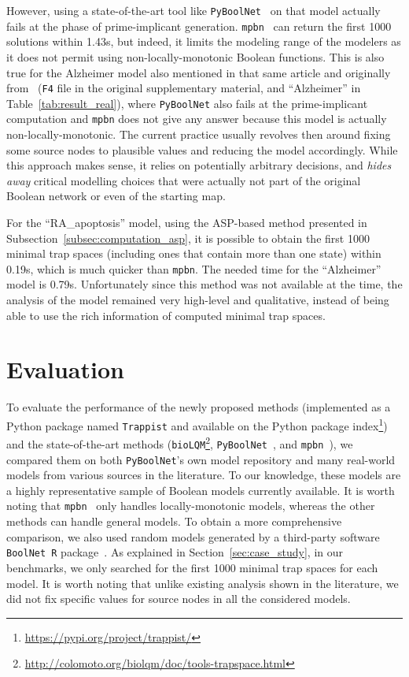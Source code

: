 \documentclass[preprint,12pt]{elsarticle}
\begin{document}
However, using a state-of-the-art tool like \texttt{PyBoolNet}~\cite{klarner2015computing} on that model actually fails at the phase of prime-implicant generation.
\texttt{mpbn}~\cite{Paulev2020} can return the first 1000 solutions within 1.43s, but indeed, it limits the modeling range of the modelers as it does not permit using non-locally-monotonic Boolean functions.
This is also true for the Alzheimer model also mentioned in that same article and originally from~\cite{ogishima2016alzpathway} (\verb|F4| file in the original supplementary material, and ``Alzheimer'' in Table~\ref{tab:result_real}), where \texttt{PyBoolNet} also fails at the prime-implicant computation and \texttt{mpbn} does not give any answer because this model is actually non-locally-monotonic.
The current practice usually revolves then around fixing some source nodes to plausible values and reducing the model accordingly.
While this approach makes sense, it relies on potentially arbitrary decisions, and \emph{hides away} critical modelling choices that were actually not part of the original Boolean network or even of the starting map.

For the ``RA\_apoptosis'' model, using the ASP-based method presented in Subsection~\ref{subsec:computation_asp}, it is possible to obtain the first 1000 minimal trap spaces (including ones that contain more than one state) within 0.19s, which is much quicker than \texttt{mpbn}.
The needed time for the ``Alzheimer'' model is 0.79s.
Unfortunately since this method was not available at the time, the analysis of the model remained very high-level and qualitative, instead of being able to use the rich information of computed minimal trap spaces.


\section{Evaluation}%
\label{sec:eval}

To evaluate the performance of the newly proposed methods (implemented as a Python package named \texttt{Trappist} and available on the Python package index\footnote{\url{https://pypi.org/project/trappist/}}) and the state-of-the-art methods (\texttt{bioLQM}\footnote{\url{http://colomoto.org/biolqm/doc/tools-trapspace.html}}, \texttt{PyBoolNet}~\cite{klarner2015computing,klarner2017pyboolnet}, and \texttt{mpbn}~\cite{Paulev2020}), we compared them on both \texttt{PyBoolNet}'s own model repository and many real-world models from various sources in the literature.
To our knowledge, these models are a highly representative sample of Boolean models currently available.
It is worth noting that \texttt{mpbn}~\cite{Paulev2020} only handles locally-monotonic models, whereas the other methods can handle general models.
To obtain a more comprehensive comparison, we also used random models generated by a third-party software \texttt{BoolNet R} package~\cite{mussel2010boolnet}.
As explained in Section~\ref{sec:case_study}, in our benchmarks, we only searched for the first 1000 minimal trap spaces for each model.
It is worth noting that unlike existing analysis shown in the literature, we did not fix specific values for source nodes in all the considered models.
\end{document}
